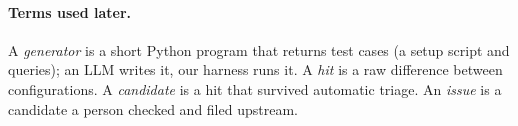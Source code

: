 \paragraph{Terms used later.} A \emph{generator} is a short Python program that returns test cases (a setup script and
queries); an LLM writes it, our harness runs it. A \emph{hit} is a raw difference between configurations. A
\emph{candidate} is a hit that survived automatic triage. An \emph{issue} is a candidate a person checked and filed upstream.
